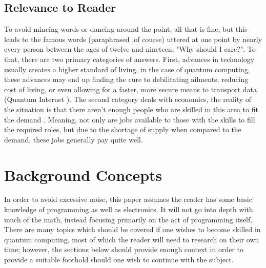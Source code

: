 \documentclass[a4paper]{article}
\newcommand{\tabhere}{} %
\begin{document}
\subsection{Relevance to Reader} %
\tabhere To avoid mincing words or dancing around the point, all that is fine, but this leads to the famous words (paraphrased ,of course) uttered at one point by nearly every person between the ages of twelve and nineteen: "Why should I care?".  To that, there are two primary categories of answers.  First, advances in technology usually creates a higher standard of living, in the case of quantum computing, these advances may end up finding the cure to debilitating ailments, reducing cost of living, or even allowing for a faster, more secure means to transport data (Quantum Internet \cite{qinternetNature}).  The second category deals with economics, the reality of the situation is that there aren't enough people who are skilled in this area to fit the demand \cite{qc5ycommercialize}.  Meaning, not only are jobs available to those with the skills to fill the required roles, but due to the shortage of supply when compared to the demand, these jobs generally pay quite well. 


\section{Background Concepts}
\label{sec:backgroundconcepts}
\tabhere In order to avoid excessive noise, this paper assumes the reader has some basic knowledge of programming as well as electronics.  It will not go into depth with much of the math, instead focusing primarily on the act of programming itself.  There are many topics which should be covered if one wishes to become skilled in quantum computing, most of which the reader will need to research on their own time; however, the sections below should provide enough context in order to provide a suitable foothold should one wish to continue with the subject.
\end{document}
